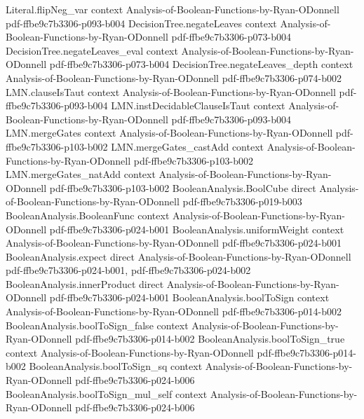 \begin{theorem}
\proofstep
  {Literal.flipNeg_var}
  {context}
  {Analysis-of-Boolean-Functions-by-Ryan-ODonnell}
  {pdf-ffbe9c7b3306-p093-b004}
\proofstep
  {DecisionTree.negateLeaves}
  {context}
  {Analysis-of-Boolean-Functions-by-Ryan-ODonnell}
  {pdf-ffbe9c7b3306-p073-b004}
\proofstep
  {DecisionTree.negateLeaves_eval}
  {context}
  {Analysis-of-Boolean-Functions-by-Ryan-ODonnell}
  {pdf-ffbe9c7b3306-p073-b004}
\proofstep
  {DecisionTree.negateLeaves_depth}
  {context}
  {Analysis-of-Boolean-Functions-by-Ryan-ODonnell}
  {pdf-ffbe9c7b3306-p074-b002}
\proofstep
  {LMN.clauseIsTaut}
  {context}
  {Analysis-of-Boolean-Functions-by-Ryan-ODonnell}
  {pdf-ffbe9c7b3306-p093-b004}
\proofstep
  {LMN.instDecidableClauseIsTaut}
  {context}
  {Analysis-of-Boolean-Functions-by-Ryan-ODonnell}
  {pdf-ffbe9c7b3306-p093-b004}
\proofstep
  {LMN.mergeGates}
  {context}
  {Analysis-of-Boolean-Functions-by-Ryan-ODonnell}
  {pdf-ffbe9c7b3306-p103-b002}
\proofstep
  {LMN.mergeGates_castAdd}
  {context}
  {Analysis-of-Boolean-Functions-by-Ryan-ODonnell}
  {pdf-ffbe9c7b3306-p103-b002}
\proofstep
  {LMN.mergeGates_natAdd}
  {context}
  {Analysis-of-Boolean-Functions-by-Ryan-ODonnell}
  {pdf-ffbe9c7b3306-p103-b002}
\proofstep
  {BooleanAnalysis.BoolCube}
  {direct}
  {Analysis-of-Boolean-Functions-by-Ryan-ODonnell}
  {pdf-ffbe9c7b3306-p019-b003}
\proofstep
  {BooleanAnalysis.BooleanFunc}
  {context}
  {Analysis-of-Boolean-Functions-by-Ryan-ODonnell}
  {pdf-ffbe9c7b3306-p024-b001}
\proofstep
  {BooleanAnalysis.uniformWeight}
  {context}
  {Analysis-of-Boolean-Functions-by-Ryan-ODonnell}
  {pdf-ffbe9c7b3306-p024-b001}
\proofstep
  {BooleanAnalysis.expect}
  {direct}
  {Analysis-of-Boolean-Functions-by-Ryan-ODonnell}
  {pdf-ffbe9c7b3306-p024-b001,
    pdf-ffbe9c7b3306-p024-b002}
\proofstep
  {BooleanAnalysis.innerProduct}
  {direct}
  {Analysis-of-Boolean-Functions-by-Ryan-ODonnell}
  {pdf-ffbe9c7b3306-p024-b001}
\proofstep
  {BooleanAnalysis.boolToSign}
  {context}
  {Analysis-of-Boolean-Functions-by-Ryan-ODonnell}
  {pdf-ffbe9c7b3306-p014-b002}
\proofstep
  {BooleanAnalysis.boolToSign_false}
  {context}
  {Analysis-of-Boolean-Functions-by-Ryan-ODonnell}
  {pdf-ffbe9c7b3306-p014-b002}
\proofstep
  {BooleanAnalysis.boolToSign_true}
  {context}
  {Analysis-of-Boolean-Functions-by-Ryan-ODonnell}
  {pdf-ffbe9c7b3306-p014-b002}
\proofstep
  {BooleanAnalysis.boolToSign_sq}
  {context}
  {Analysis-of-Boolean-Functions-by-Ryan-ODonnell}
  {pdf-ffbe9c7b3306-p024-b006}
\proofstep
  {BooleanAnalysis.boolToSign_mul_self}
  {context}
  {Analysis-of-Boolean-Functions-by-Ryan-ODonnell}
  {pdf-ffbe9c7b3306-p024-b006}

\end{theorem}
